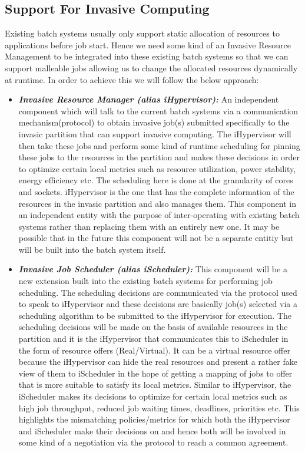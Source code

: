 \documentclass[a4paper, 12pt]{article}
\begin{document}
\subsection{Support For Invasive Computing}
Existing batch systems usually only support static allocation of resources to applications before job start. Hence we need some kind of an Invasive Resource Management to be integrated into these existing batch systems so that we can support malleable jobs allowing us to change the allocated resources dynamically at runtime. In order to achieve this we will follow the below approach:
\begin{itemize}
\item \textbf{\textit{Invasive Resource Manager (alias iHypervisor):}} An independent component which will talk to the current batch systems via a communication mechanism(protocol) to obtain invasive job(s) submitted specifically to the invasic partition that can support invasive computing. The iHypervisor will then take these jobs and perform some kind of runtime scheduling for pinning these jobs to the resources in the partition and makes these decisions in order to optimize certain local metrics such as resource utilization, power stability, energy efficiency etc. The scheduling here is done at the granularity of cores and sockets. iHypervisor is the one that has the complete information of the resources in the invasic partition and also manages them. This component in an independent entity with the purpose of inter-operating with existing batch systems rather than replacing them with an entirely new one. It may be possible that in the future this component will not be a separate entitiy but will be built into the batch system itself.
\item \textbf{\textit{Invasive Job Scheduler (alias iScheduler):}} This component will be a new extension built into the existing batch systems for performing job scheduling. The scheduling decisions are communicated via the protocol used to speak to iHypervisor and these decisions are basically job(s) selected via a scheduling algorithm to be submitted to the iHypervisor for execution. The scheduling decisions will be made on the basis of available resources in the partition and it is the iHypervisor that communicates this to iScheduler in the form of resource offers (Real/Virtual). It can be a virtual resource offer because the iHypervisor can hide the real resources and present a rather fake view of them to iScheduler in the hope of getting a mapping of jobs to offer that is more suitable to satisfy its local metrics. Similar to iHypervisor, the iScheduler makes its decisions to optimize for certain local metrics such as high job throughput, reduced job waiting times, deadlines, priorities etc. This highlights the mismatching policies/metrics for which both the iHypervisor and iScheduler make their decisions on and hence both will be involved in some kind of a negotiation via the protocol to reach a common agreement.

\end{itemize}
\end{document}
